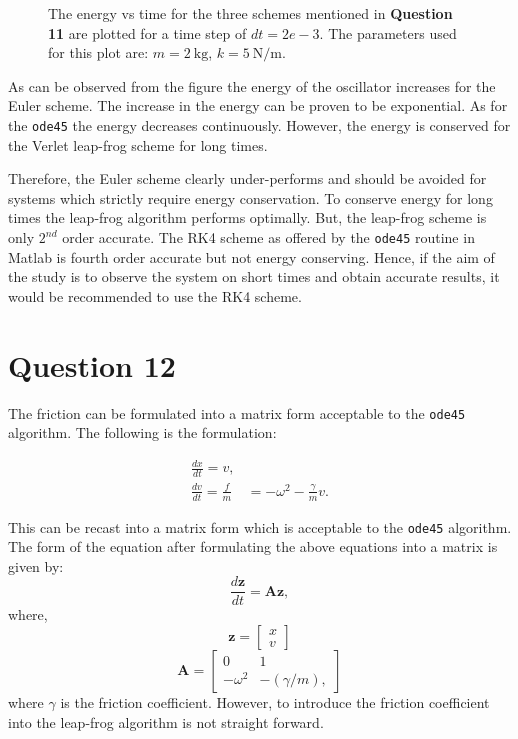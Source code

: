 \documentclass[10pt]{article}
\begin{document}
\begin{figure}[!htb]
\centering

\caption{The energy vs time for the three schemes mentioned in \textbf{Question 11} are plotted for a time step of $dt=2e-3$. The parameters used for this plot are: $m=2\ \mathrm{kg}$, $k=5\ \mathrm{N/m}$.}
\label{fig:energy_vs_time_integration_schemes_compare}
\end{figure} 

As can be observed from the figure the energy of the oscillator increases for the Euler scheme. The increase in the energy can be proven to be exponential. As for the \texttt{ode45} the energy decreases continuously. However, the energy is conserved for the Verlet leap-frog scheme for long times. 

Therefore, the Euler scheme clearly under-performs and should be avoided for systems which strictly require energy conservation. To conserve energy for long times the leap-frog algorithm performs optimally. But, the leap-frog scheme is only $2^{nd}$ order accurate. The RK4 scheme as offered by the \texttt{ode45} routine in Matlab is fourth order accurate but not energy conserving. Hence, if the aim of the study is to observe the system on short times and obtain accurate results, it would be recommended to use the RK4 scheme.   

\section*{Question 12}
The friction can be formulated into a matrix form acceptable to the \texttt{ode45} algorithm. The following is the formulation:

\begin{eqnarray}
\frac{dx}{dt}=v, \\
\frac{dv}{dt}=\frac{f}{m} &= -\omega^2 -\frac{\gamma}{m} v.
\end{eqnarray}

This can be recast into a matrix form which is acceptable to the \texttt{ode45} algorithm. The form of the equation after formulating the above equations into a matrix is given by:
%
\begin{equation}
\frac{d\bm{z}}{dt} = \bm{A}\bm{z},
\end{equation}
%
where,
%
\begin{equation}
\bm{z} = 
\begin{bmatrix}
x \\
v 
\end{bmatrix}
\end{equation}
%
\begin{equation}
\bm{A} = 
\begin{bmatrix}
0 & 1 \\
-\omega^2 & -(\gamma/m),
\end{bmatrix}
\end{equation}
%
where $\gamma$ is the friction coefficient. However, to introduce the friction coefficient into the leap-frog algorithm is not straight forward.
\end{document}
